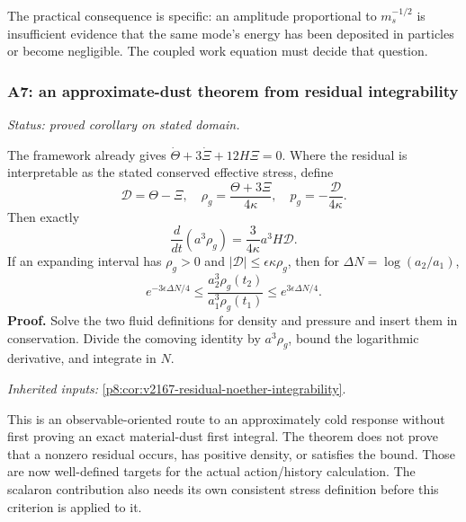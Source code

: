 \documentclass[12pt,a4paper]{article}
\begin{document}
The practical consequence is specific: an amplitude proportional to
\(m_s^{-1/2}\) is insufficient evidence that the same mode's energy has
been deposited in particles or become negligible. The coupled work equation
must decide that question.

\subsubsection{A7: an approximate-dust theorem from residual integrability}
\label{p8:sec:v2201-derived-a7}
\noindent\textit{Status: proved corollary on stated domain.}

The framework already gives
\(\dot\Theta+3\dot\Xi+12H\Xi=0\). Where the residual is interpretable
as the stated conserved effective stress, define
\[
\mathcal D=\Theta-\Xi,\quad
\rho_g=\frac{\Theta+3\Xi}{4\kappa},\quad
p_g=-\frac{\mathcal D}{4\kappa}.
\]
Then exactly
\[
\boxed{\frac{d}{dt}(a^3\rho_g)
 =\frac{3}{4\kappa}a^3H\mathcal D.}
\]
If an expanding interval has \(\rho_g>0\) and
\(|\mathcal D|\le\epsilon\kappa\rho_g\), then for
\(\Delta N=\log(a_2/a_1)\),
\[
\boxed{e^{-3\epsilon\Delta N/4}
\le\frac{a_2^3\rho_g(t_2)}{a_1^3\rho_g(t_1)}
\le e^{3\epsilon\Delta N/4}.}
\]
\textbf{Proof.} Solve the two fluid definitions for density and pressure
and insert them in conservation. Divide the comoving identity by
\(a^3\rho_g\), bound the logarithmic derivative, and integrate in \(N\).
\par\noindent\textit{Inherited inputs:} \ref{p8:cor:v2167-residual-noether-integrability}.

This is an observable-oriented route to an approximately cold response
without first proving an exact material-dust first integral. The theorem
does not prove that a nonzero residual occurs, has positive density, or
satisfies the bound. Those are now well-defined targets for the actual
action/history calculation. The scalaron contribution also needs its own
consistent stress definition before this criterion is applied to it.

\end{document}
